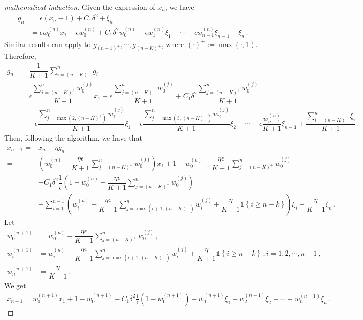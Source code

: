 \documentclass[11pt,letterpaper,english]{article}
\begin{document}
\begin{proof}[mathematical induction]
Given the expression of $x_n$, we have
\begin{align*}
g_n &= \epsilon (x_n-1) + C_1 \delta^2 + \xi_n \\
&= \epsilon w^{(n)}_0 x_1 - \epsilon w^{(n)}_0 + C_1 \delta^2w^{(n)}_0 -\epsilon w^{(n)}_1 \xi_1-\cdots-\epsilon w^{(n)}_{n-1} \xi_{n-1}+\xi_n \,.
\end{align*}
Similar results can apply to $g_{(n-1)^+}, \cdots,g_{(n-K)^+}$, where $(\cdot)^+:=\max\left(\cdot, 1 \right)$. Therefore, 
\begin{align*}
\bar{g}_n =& \dfrac{1}{K+1}\sum_{i=(n-K)^+}^n g_i \\
=& \epsilon \dfrac{\sum_{j=(n-K)^+}^n w^{(j)}_0}{K+1} x_1 - \epsilon \dfrac{\sum_{j=(n-K)^+}^n w^{(j)}_0}{K+1} +C_1 \delta^2  \dfrac{\sum_{j=(n-K)^+}^n w^{(j)}_0}{K+1}\\
&-\epsilon \dfrac{\sum_{j=\max\left(2,(n-K)^+\right)}^n w^{(j)}_1}{K+1} \xi_1
-\epsilon \dfrac{\sum_{j=\max\left(3,(n-K)^+\right)}^n w^{(j)}_2}{K+1} \xi_2-\cdots
-\epsilon \dfrac{w^{(n)}_{n-1}}{K+1} \xi_{n-1}  +\dfrac{\sum_{i=(n-K)^+}^n \xi_i}{K+1} \,.
\end{align*}
Then, following the algorithm, we have that
\begin{align*}
x_{n+1} =& x_n -\eta \bar{g}_n \\
=& \left( w^{(n)}_0-\dfrac{\eta \epsilon}{K+1} \sum_{j=(n-K)^+}^n w^{(j)}_0  \right)x_1
+1- w^{(n)}_0+\dfrac{\eta \epsilon}{K+1} \sum_{j=(n-K)^+}^n w^{(j)}_0 \\
&- C_1 \delta^2\dfrac{1}{\epsilon} \left(1- w^{(n)}_0+\dfrac{\eta \epsilon}{K+1} \sum_{j=(n-K)^+}^n w^{(j)}_0    \right) \\
&-  \sum_{i=1}^{n-1} \left( w^{(n)}_i- \dfrac{\eta \epsilon}{K+1} \sum_{j=\max \left(i+1,(n-K)^+\right)}^n w^{(j)}_i +\dfrac{\eta}{K+1} \mathbb{1}\left\lbrace i \geq n-k \right\rbrace \right) \xi_i  -\dfrac{\eta}{K+1}\xi_n \,.
\end{align*}
Let 
\begin{align*}
w^{(n+1)}_0 &= w^{(n)}_0-\dfrac{\eta \epsilon}{K+1} \sum_{j=(n-K)^+}^n w^{(j)}_0 \,,\\
w^{(n+1)}_i &= w^{(n)}_i- \dfrac{\eta \epsilon}{K+1} \sum_{j=\max \left(i+1,(n-K)^+\right)}^n w^{(j)}_i +\dfrac{\eta}{K+1} \mathbb{1}\left\lbrace i \geq n-k \right\rbrace \,,i=1,2,\cdots,n-1 \,, \\
w^{(n+1)}_n &=\dfrac{\eta}{K+1} \,.
\end{align*}
We get 
\begin{align*}
x_{n+1} = w^{(n+1)}_0 x_1 + 1-w^{(n+1)}_0 -C_1 \delta^2 \frac{1}{\epsilon}(1-w^{(n+1)}_0) -w^{(n+1)}_1 \xi_1 - w^{(n+1)}_2 \xi_2 - \cdots - w^{(n+1)}_{n} \xi_{n} \,.

\end{align*}
\end{proof}
\end{document}
